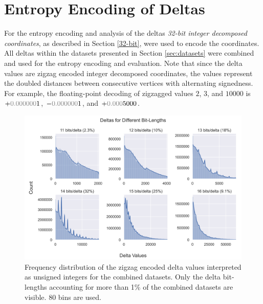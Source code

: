 


\section{Entropy Encoding of Deltas}
For the entropy encoding and analysis of the deltas \textit{32-bit integer decomposed coordinates}, as described in Section \ref{32-bit}, were used to encode the coordinates. All deltas within the datasets presented in Section \ref{sec:datasets} were combined and used for the entropy encoding and evaluation. Note that since the delta values are zigzag encoded integer decomposed coordinates, the values represent the doubled distances between consecutive vertices with alternating signedness. For example, the floating-point decoding of zigzagged values $2$, $3$, and $10000$ is $+ {\color{gray}0.000000}1$, $- {\color{gray}0.000000}1$, and $+ {\color{gray}0.000}5000$.

\begin{figure}[H]
    \centering
    \includegraphics[width=15cm]{images/delta_distrb.png}
    \caption{Frequency distribution of the zigzag encoded delta values interpreted as unsigned integers for the combined datasets. Only the delta bit-lengths accounting for more than 1\% of the combined datasets are visible. 80 bins are used.}
    \label{fig:deltadistrb}
\end{figure}


